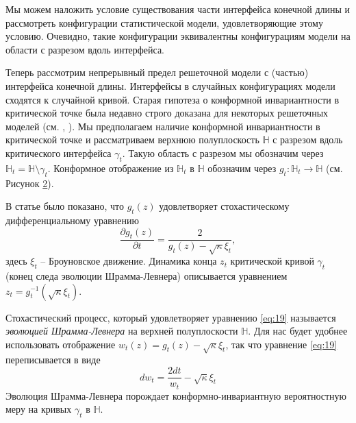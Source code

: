 \begin{figure}[h]
  \label{fig:sle}
\end{figure}
Мы можем наложить условие существования части интерфейса конечной длины и рассмотреть конфигурации статистической модели, удовлетворяющие этому условию. Очевидно, такие конфигурации эквивалентны конфигурациям модели на области с разрезом вдоль интерфейса. 

Теперь рассмотрим непрерывный предел решеточной модели с (частью) интерфейса конечной длины. Интерфейсы в случайных конфигурациях модели сходятся к случайной кривой. Старая гипотеза \cite{Polyakov:1970xd} о конформной инвариантности в критической точке была недавно строго доказана для некоторых решеточных моделей (см. \cite{smirnov2007towards}, \cite{duminil2011conformal}). Мы предполагаем наличие конформной инвариантности в критической точке и рассматриваем верхнюю полуплоскость  $\mathbb{H}$ с разрезом вдоль критического интерфейса  $\gamma_{t}$. Такую область с разрезом мы обозначим через  $\mathbb{H}_{t}=\mathbb{H}\setminus \gamma_{t}$. Конформное отображение из $\mathbb{H}_{t}$ в $\mathbb{H}$ обозначим через $g_{t}:\mathbb{H}_{t}\to \mathbb{H}$ (см. Рисунок \ref{fig:sle2}).

\begin{figure}[h]
  \label{fig:sle2}
\end{figure}

В статье \cite{schramm2000scaling} было показано, что  $g_{t}(z)$ удовлетворяет стохастическому дифференциальному уравнению
\begin{equation}
\label{eq:19}
  \frac{\partial g_t(z)}{\partial t} = \frac{ 2}{g_t(z)-\sqrt{\kappa}\xi_{t}} ,
\end{equation}
здесь $\xi_{t}$ -- Броуновское движение. Динамика конца  $z_{t}$ критической кривой $\gamma_{t}$ (конец следа эволюции Шрамма-Левнера) описывается уравнением $z_{t}=g_{t}^{-1}(\sqrt{\kappa}\xi_{t})$. 

Стохастический процесс, который удовлетворяет уравнению \eqref{eq:19} называется {\it эволюцией Шрамма-Левнера} на верхней полуплоскости $\mathbb{H}$. Для нас будет удобнее использовать отображение $w_{t} (z)=g_{t}(z)-\sqrt{\kappa}\xi_{t}$, так что уравнение \eqref{eq:19} переписывается в виде
\begin{equation}
  \label{eq:20}
       d w _{t}= \frac{2dt}{w_{t} }-\sqrt{\kappa}\xi_{t}  
\end{equation}
Эволюция Шрамма-Левнера порождает конформно-инвариантную вероятностную меру на кривых $\gamma_{t}$ в $\mathbb{H}$.

